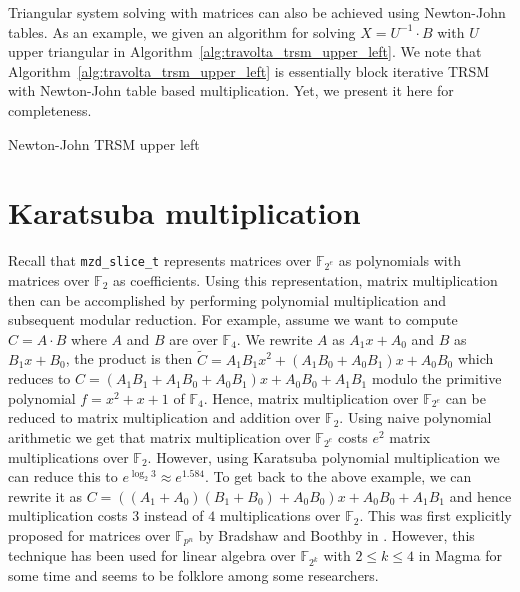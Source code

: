 \documentclass{sig-alternate}
\newcommand{\ring}[1]{\mathbb{#1}}
\newcommand{\F}{\ensuremath{\ring{F}}\xspace}
\newcommand{\FZ}{\ensuremath{\ring{F}_2}\xspace}
\newcommand{\FZE}{\ensuremath{\ring{F}_{2^e}}\xspace}
\newcommand{\mzdslicet}{\texttt{mzd\-\_slice\-\_t}\xspace}
\begin{document}
Triangular system solving with matrices can also be achieved using Newton-John tables. As an example, we given an algorithm for solving $X = U^{-1} \cdot B$ with $U$ upper triangular in Algorithm~\ref{alg:travolta_trsm_upper_left}. We note that Algorithm~\ref{alg:travolta_trsm_upper_left} is essentially block iterative TRSM with Newton-John table based multiplication. Yet, we present it here for completeness.

\begin{algorithm}[h]
\caption{Newton-John TRSM upper left}
\label{alg:travolta_trsm_upper_left}
\end{algorithm}

\section{Karatsuba multiplication} \label{sec:karatsuba}

Recall that \mzdslicet represents matrices over \FZE as polynomials with matrices over \FZ as coefficients. Using this representation, matrix multiplication then can be accomplished by performing polynomial multiplication and subsequent modular reduction. For example, assume we want to compute $C=A\cdot B$ where $A$ and $B$ are over $\F_{4}$. We rewrite $A$ as $ A_1x + A_0$ and $B$ as $ B_1x + B_0$, the product is then ${\tilde C} = A_1B_1x^2 + (A_1B_0 + A_0B_1)x + A_0B_0$ which reduces to $C = (A_1B_1 + A_1B_0 + A_0B_1)x + A_0B_0 + A_1B_1$ modulo the primitive polynomial $f = x^2 + x + 1$ of $\F_{4}$. Hence, matrix multiplication over \FZE can be reduced to matrix multiplication and addition over \FZ. Using naive polynomial arithmetic we get that matrix multiplication over \FZE costs $e^2$ matrix multiplications over \FZ. However, using Karatsuba polynomial multiplication we can reduce this to $e^{\log_2 3} \approx e^{1.584}$. To get back to the above example, we can rewrite it as $C = ((A_1 + A_0)(B_1 + B_0) + A_0B_0)x + A_0B_0 + A_1B_1$ and hence multiplication costs $3$ instead of $4$ multiplications over \FZ. This was first explicitly proposed for matrices over $\F_{p^n}$ by Bradshaw and Boothby in \cite{BB09}. However, this technique has been used for linear algebra over $\F_{2^k}$ with $2 \leq k \leq 4$ in Magma for some time \cite{steel:gf2k} and seems to be folklore among some researchers.
\end{document}
